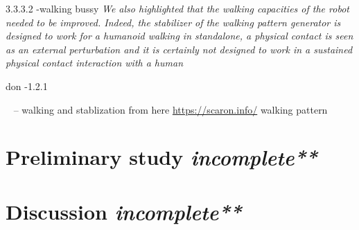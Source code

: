
3.3.3.2 -walking bussy
\textit{We also highlighted that the walking capacities of the robot needed to be improved.
	Indeed, the stabilizer of the walking pattern generator is designed to work for a humanoid
	walking in standalone, a physical contact is seen as an external perturbation and it is certainly
	not designed to work in a sustained physical contact interaction with a human}


don -1.2.1

~\cite{caron2018stair} -- walking and stablization from here
\url{https://scaron.info/}
\cite{caron2016humanoids} walking pattern

\cite{kajita2010biped}








\section{Preliminary study \textit{incomplete**}}

%
%




\section{Discussion \textit{incomplete**}}
%
%
%



\clearpage %



